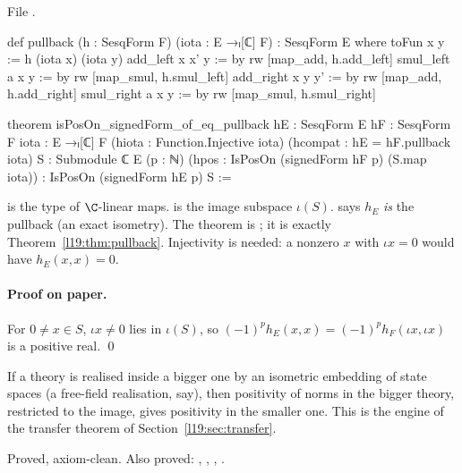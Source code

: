 \noindent File .
\begin{leancode}
def pullback (h : SesqForm F) (iota : E →ₗ[ℂ] F) : SesqForm E where
  toFun x y := h (iota x) (iota y)
  add_left x x' y := by rw [map_add, h.add_left]
  smul_left a x y := by rw [map_smul, h.smul_left]
  add_right x y y' := by rw [map_add, h.add_right]
  smul_right a x y := by rw [map_smul, h.smul_right]

theorem isPosOn_signedForm_of_eq_pullback {hE : SesqForm E} {hF : SesqForm F}
    {iota : E →ₗ[ℂ] F} (hiota : Function.Injective iota)
    (hcompat : hE = hF.pullback iota) {S : Submodule ℂ E} (p : ℕ)
    (hpos : IsPosOn (signedForm hF p) (S.map iota)) :
    IsPosOn (signedForm hE p) S :=
\end{leancode}

\begin{dictionary}
 is the type of $\C$-linear maps.  is the image subspace
$\iota(S)$.  says $h_E$ \emph{is} the pullback (an exact
isometry). The theorem is \allowbreak{}\allowbreak{}\allowbreak{}\allowbreak{}\allowbreak{}; it is exactly
Theorem~\ref{l19:thm:pullback}. Injectivity is needed: a nonzero $x$ with $\iota x = 0$ would have
$h_E(x,x) = 0$.
\end{dictionary}

\paragraph{Proof on paper.} For $0\ne x\in S$, $\iota x\ne0$ lies in $\iota(S)$, so
$(-1)^ph_E(x,x) = (-1)^ph_F(\iota x,\iota x)$ is a positive real. \qed

\begin{physics}
If a theory is realised inside a bigger one by an isometric embedding of state spaces (a free-field
realisation, say), then positivity of norms in the bigger theory, restricted to the image,
gives positivity in the smaller one.
This is the engine of the transfer theorem of Section~\ref{l19:sec:transfer}.
\end{physics}

\begin{status}
Proved, axiom-clean. Also proved: , ,
, .
\end{status}

